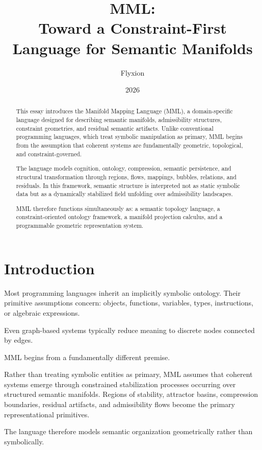\documentclass[11pt]{article}
\title{MML:\\
Toward a Constraint-First Language for Semantic Manifolds}
\author{Flyxion}
\date{2026}
\begin{document}
\maketitle

\begin{abstract}

This essay introduces the Manifold Mapping Language (MML), a domain-specific language designed for describing semantic manifolds, admissibility structures, constraint geometries, and residual semantic artifacts. Unlike conventional programming languages, which treat symbolic manipulation as primary, MML begins from the assumption that coherent systems are fundamentally geometric, topological, and constraint-governed.

The language models cognition, ontology, compression, semantic persistence, and structural transformation through regions, flows, mappings, bubbles, relations, and residuals. In this framework, semantic structure is interpreted not as static symbolic data but as a dynamically stabilized field unfolding over admissibility landscapes.

MML therefore functions simultaneously as:
a semantic topology language,
a constraint-oriented ontology framework,
a manifold projection calculus,
and a programmable geometric representation system.

\end{abstract}

\section{Introduction}

Most programming languages inherit an implicitly symbolic ontology. Their primitive assumptions concern:
objects,
functions,
variables,
types,
instructions,
or algebraic expressions.

Even graph-based systems typically reduce meaning to discrete nodes connected by edges.

MML begins from a fundamentally different premise.

Rather than treating symbolic entities as primary, MML assumes that coherent systems emerge through constrained stabilization processes occurring over structured semantic manifolds. Regions of stability, attractor basins, compression boundaries, residual artifacts, and admissibility flows become the primary representational primitives.

The language therefore models semantic organization geometrically rather than symbolically.
\end{document}
